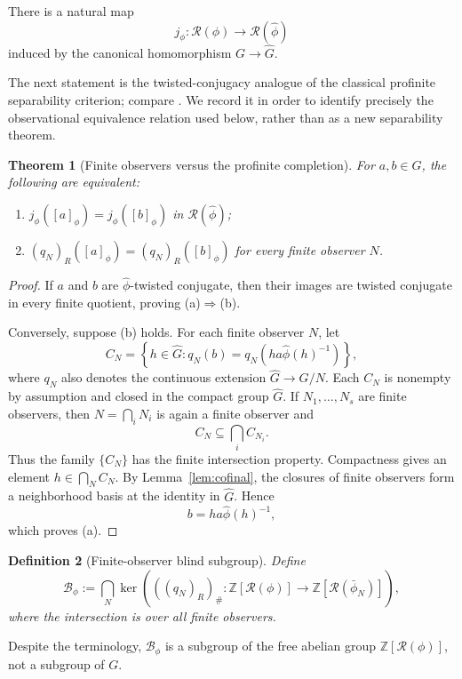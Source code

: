 \documentclass[11pt]{article}
\newtheorem{theorem}{Theorem}[section]
\newtheorem{definition}[theorem]{Definition}
\newcommand{\RN}{\mathcal R}
\newcommand{\Z}{\mathbb Z}
\newcommand{\wideG}{\widehat G}
\newcommand{\phihat}{\widehat\phi}
\begin{document}
There is a natural map
\[
  j_\phi\colon\RN(\phi)\longrightarrow\RN(\phihat)
\]
induced by the canonical homomorphism $G\to\wideG$.

The next statement is the twisted-conjugacy analogue of the classical
profinite separability criterion; compare \cite{FelTro,Tertooy}.  We record
it in order to identify precisely the observational equivalence relation used
below, rather than as a new separability theorem.

\begin{theorem}[Finite observers versus the profinite completion]
\label{thm:profinite}
For $a,b\in G$, the following are equivalent:
\begin{enumerate}[label=(\alph*)]
\item $j_\phi([a]_\phi)=j_\phi([b]_\phi)$ in $\RN(\phihat)$;
\item $(q_N)_R([a]_\phi)=(q_N)_R([b]_\phi)$ for every finite observer $N$.
\end{enumerate}
\end{theorem}

\begin{proof}
If $a$ and $b$ are $\phihat$-twisted conjugate, then their images are twisted
conjugate in every finite quotient, proving (a)$\Rightarrow$(b).

Conversely, suppose (b) holds.  For each finite observer $N$, let
\[
  C_N=\left\{h\in\wideG:
  q_N(b)=q_N(h a\phihat(h)^{-1})\right\},
\]
where $q_N$ also denotes the continuous extension $\wideG\to G/N$.
Each $C_N$ is nonempty by assumption and closed in the compact group
$\wideG$.  If $N_1,\dots,N_s$ are finite observers, then
$N=\bigcap_iN_i$ is again a finite observer and
\[
  C_N\subseteq\bigcap_i C_{N_i}.
\]
Thus the family $\{C_N\}$ has the finite intersection property.  Compactness
gives an element $h\in\bigcap_N C_N$.  By Lemma~\ref{lem:cofinal}, the
closures of finite observers form a neighborhood basis at the identity in
$\wideG$.  Hence
\[
  b=h a\phihat(h)^{-1},
\]
which proves (a).
\end{proof}

\begin{definition}[Finite-observer blind subgroup]
Define
\[
  \mathcal B_\phi
  :=\bigcap_N\ker\left(((q_N)_R)_\#:
  \Z[\RN(\phi)]\to\Z[\RN(\bar\phi_N)]\right),
\]
where the intersection is over all finite observers.
\end{definition}
Despite the terminology, $\mathcal B_\phi$ is a subgroup of the free
abelian group $\Z[\RN(\phi)]$, not a subgroup of $G$.
\end{document}
